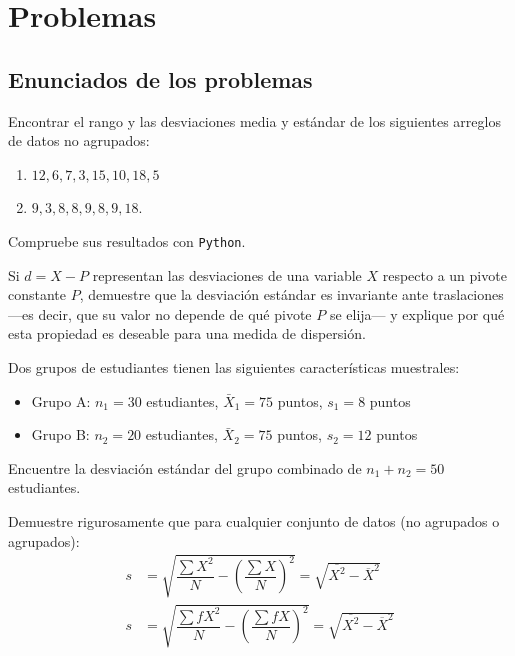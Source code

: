 \section*{Problemas}

\subsection*{Enunciados de los problemas}

\begin{problema}
	\label{prob:ba2e465}
	Encontrar el rango y las desviaciones media y estándar de los siguientes arreglos de datos no agrupados:
	\begin{enumerate}
		\item $12, 6, 7, 3, 15, 10, 18, 5$
		\item $9, 3, 8, 8, 9, 8, 9, 18.$
	\end{enumerate}
	Compruebe sus resultados con \texttt{Python}.
\end{problema}

\begin{problema}
	\label{prob:c5833ad}
	Si $d=X-P$ representan las desviaciones de una variable $X$ respecto a un pivote constante $P$, demuestre que la desviación estándar es invariante ante traslaciones —es decir, que su valor no depende de qué pivote $P$ se elija— y explique por qué esta propiedad es deseable para una medida de dispersión.
\end{problema}

\begin{problema}
	\label{prob:d87f55c}
	Dos grupos de estudiantes tienen las siguientes características muestrales:
	\begin{itemize}
		\item Grupo A: $n_1 = 30$ estudiantes, $\bar{X}_1 = 75$ puntos, $s_1 = 8$ puntos
		\item Grupo B: $n_2 = 20$ estudiantes, $\bar{X}_2 = 75$ puntos, $s_2 = 12$ puntos
	\end{itemize}
	Encuentre la desviación estándar del grupo combinado de $n_1 + n_2 = 50$ estudiantes.
\end{problema}

\begin{problema}
	\label{prob:6112df0}
	Demuestre rigurosamente que para cualquier conjunto de datos (no agrupados o agrupados):
	\begin{align}
		s &= \sqrt{\dfrac{\sum X^{2}}{N}-\left( \dfrac{\sum X}{N} \right)^{2}} = \sqrt{\overline{X^{2}}-\overline{X}^{2}}\\
		s &= \sqrt{\dfrac{\sum fX^{2}}{N}-\left( \dfrac{\sum fX}{N} \right)^{2}} = \sqrt{\overline{X^{2}}-\overline{X}^{2}}
	\end{align}
\end{problema}

